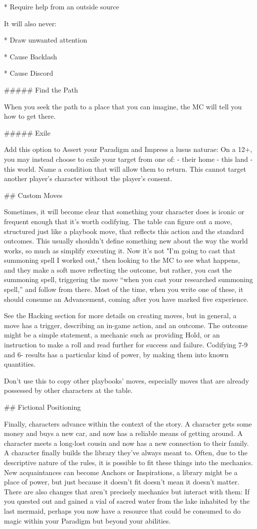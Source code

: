 \documentclass[
  oneside,
  statementpaper,
  9pt]{memoir}
\begin{document}
\begin{Player}
* Require help from an outside source

It will also never:

* Draw unwanted attention

* Cause Backlash

* Cause Discord

##### Find the Path

When you seek the path to a place that you can imagine, the MC will tell you how to get there.

##### Exile

Add this option to Assert your Paradigm and Impress a lusus naturae: On a 12+, you may instead choose to exile your target from one of: - their home - this land - this world. Name a condition that will allow them to return. This cannot target another player’s character without the player’s consent.

## Custom Moves

Sometimes, it will become clear that something your character does is iconic or frequent enough that it’s worth codifying. The table can figure out a move, structured just like a playbook move, that reflects this action and the standard outcomes. This usually shouldn’t define something new about the way the world works, so much as simplify executing it. Now it’s not "I’m going to cast that summoning spell I worked out," then looking to the MC to see what happens, and they make a soft move reflecting the outcome, but rather, you cast the summoning spell, triggering the move “when you cast your researched summoning spell,” and follow from there. Most of the time, when you write one of these, it should consume an Advancement, coming after you have marked five experience.

See the Hacking section for more details on creating moves, but in general, a move has a trigger, describing an in-game action, and an outcome. The outcome might be a simple statement, a mechanic such as providing Hold, or an instruction to make a roll and read further for success and failure. Codifying 7-9 and 6- results has a particular kind of power, by making them into known quantities.

Don’t use this to copy other playbooks’ moves, especially moves that are already possessed by other characters at the table.

## Fictional Positioning

Finally, characters advance within the context of the story. A character gets some money and buys a new car, and now has a reliable means of getting around. A character meets a long-lost cousin and now has a new connection to their family. A character finally builds the library they’ve always meant to. Often, due to the descriptive nature of the rules, it is possible to fit these things into the mechanics. New acquaintances can become Anchors or Inspirations, a library might be a place of power, but just because it doesn’t fit doesn’t mean it doesn’t matter. There are also changes that aren’t precisely mechanics but interact with them: If you quested out and gained a vial of sacred water from the lake inhabited by the last mermaid, perhaps you now have a resource that could be consumed to do magic within your Paradigm but beyond your abilities.


\end{Player}
\end{document}
